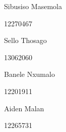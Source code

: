 \documentclass{article}
\begin{document}
\begin{titlepage}
\begin{center}
			\begin{minipage}{0.4\textwidth}
				\begin{flushleft} \large
					Sibusiso {Masemola}
				\end{flushleft}
			\end{minipage}
			\begin{minipage}{0.4\textwidth}
				\begin{flushright} \large
					\emph{}
					12270467
				\end{flushright}
			\end{minipage}
			
			\begin{minipage}{0.4\textwidth}
				\begin{flushleft} \large
					Sello {Thosago}
				\end{flushleft}
			\end{minipage}
			\begin{minipage}{0.4\textwidth}
				\begin{flushright} \large
					\emph{}
					13062060
				\end{flushright}
			\end{minipage}
			
			\begin{minipage}{0.4\textwidth}
				\begin{flushleft} \large
					Banele {Nxumalo}
				\end{flushleft}
			\end{minipage}
			\begin{minipage}{0.4\textwidth}
				\begin{flushright} \large
					\emph{}
					12201911
				\end{flushright}
			\end{minipage}
			
			\begin{minipage}{0.4\textwidth}
				\begin{flushleft} \large
					Aiden {Malan}
				\end{flushleft}
			\end{minipage}
			\begin{minipage}{0.4\textwidth}
				\begin{flushright} \large
					\emph{}
					12265731
				\end{flushright}
			\end{minipage}
			
			
			\vfill
			
		\end{center}
	\end{titlepage}
	\footnotesize
	\normalsize
	
\end{document}
